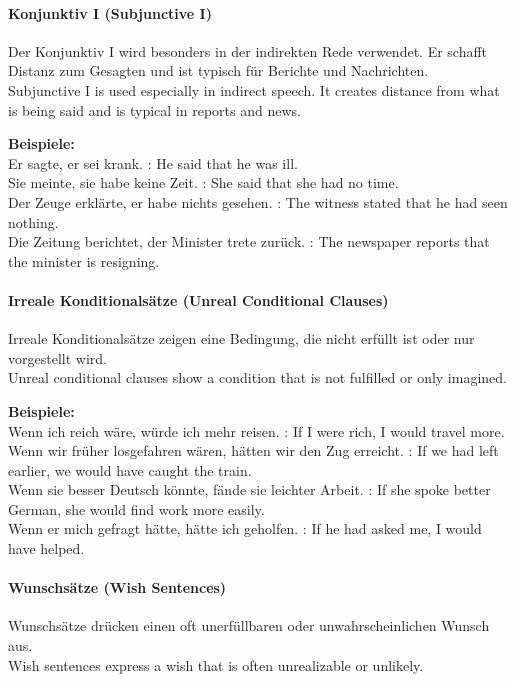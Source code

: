 \documentclass[a4paper]{article}
\begin{document}
    \paragraph{Konjunktiv I {\small (Subjunctive I)}}
        Der Konjunktiv I wird besonders in der indirekten Rede verwendet. Er schafft Distanz zum Gesagten und ist typisch für Berichte und Nachrichten.\\
        Subjunctive I is used especially in indirect speech. It creates distance from what is being said and is typical in reports and news.
        
        \textbf{Beispiele:}\\
        Er sagte, er sei krank. : He said that he was ill.\\
        Sie meinte, sie habe keine Zeit. : She said that she had no time.\\
        Der Zeuge erklärte, er habe nichts gesehen. : The witness stated that he had seen nothing.\\
        Die Zeitung berichtet, der Minister trete zurück. : The newspaper reports that the minister is resigning.
    
    \paragraph{Irreale Konditionalsätze {\small (Unreal Conditional Clauses)}}
        Irreale Konditionalsätze zeigen eine Bedingung, die nicht erfüllt ist oder nur vorgestellt wird.\\
        Unreal conditional clauses show a condition that is not fulfilled or only imagined.
        
        \textbf{Beispiele:}\\
        Wenn ich reich wäre, würde ich mehr reisen. : If I were rich, I would travel more.\\
        Wenn wir früher losgefahren wären, hätten wir den Zug erreicht. : If we had left earlier, we would have caught the train.\\
        Wenn sie besser Deutsch könnte, fände sie leichter Arbeit. : If she spoke better German, she would find work more easily.\\
        Wenn er mich gefragt hätte, hätte ich geholfen. : If he had asked me, I would have helped.
    
    \paragraph{Wunschsätze {\small (Wish Sentences)}}
        Wunschsätze drücken einen oft unerfüllbaren oder unwahrscheinlichen Wunsch aus.\\
        Wish sentences express a wish that is often unrealizable or unlikely.
        
\end{document}
